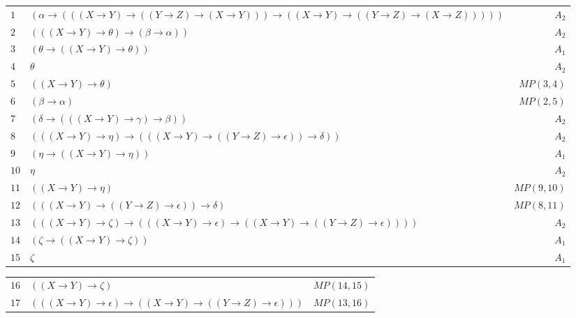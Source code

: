 \begin{ans}
{    \begin{tabular*}{\textwidth}{l l r}
      $1$ & $( \alpha  \rightarrow (((X \rightarrow Y) \rightarrow ((Y \rightarrow Z) \rightarrow (X \rightarrow Y))) \rightarrow ((X \rightarrow Y) \rightarrow ((Y \rightarrow Z) \rightarrow (X \rightarrow Z)))))$ & $A_2$ \\
      $2$ & $(((X \rightarrow Y) \rightarrow  \theta ) \rightarrow ( \beta  \rightarrow  \alpha ))$ & $A_2$ \\
      $3$ & $( \theta  \rightarrow ((X \rightarrow Y) \rightarrow  \theta ))$ & $A_1$ \\
      $4$ & $ \theta $ & $A_2$ \\
      $5$ & $((X \rightarrow Y) \rightarrow  \theta )$ & $MP(3,4)$ \\
      $6$ & $( \beta  \rightarrow  \alpha )$ & $MP(2,5)$ \\
      $7$ & $( \delta  \rightarrow (((X \rightarrow Y) \rightarrow  \gamma ) \rightarrow  \beta ))$ & $A_2$ \\
      $8$ & $(((X \rightarrow Y) \rightarrow  \eta ) \rightarrow (((X \rightarrow Y) \rightarrow ((Y \rightarrow Z) \rightarrow  \epsilon )) \rightarrow  \delta ))$ & $A_2$ \\
      $9$ & $( \eta  \rightarrow ((X \rightarrow Y) \rightarrow  \eta ))$ & $A_1$ \\
      $10$ & $ \eta $ & $A_2$ \\
      $11$ & $((X \rightarrow Y) \rightarrow  \eta )$ & $MP(9,10)$ \\
      $12$ & $(((X \rightarrow Y) \rightarrow ((Y \rightarrow Z) \rightarrow  \epsilon )) \rightarrow  \delta )$ & $MP(8,11)$ \\
      $13$ & $(((X \rightarrow Y) \rightarrow  \zeta ) \rightarrow (((X \rightarrow Y) \rightarrow  \epsilon ) \rightarrow ((X \rightarrow Y) \rightarrow ((Y \rightarrow Z) \rightarrow  \epsilon ))))$ & $A_2$ \\
      $14$ & $( \zeta  \rightarrow ((X \rightarrow Y) \rightarrow  \zeta ))$ & $A_1$ \\
      $15$ & $ \zeta $ & $A_1$
    \end{tabular*}
    \begin{tabular*}{\textwidth}{l l r}
      $16$ & $((X \rightarrow Y) \rightarrow  \zeta )$ & $MP(14,15)$ \\
      $17$ & $(((X \rightarrow Y) \rightarrow  \epsilon ) \rightarrow ((X \rightarrow Y) \rightarrow ((Y \rightarrow Z) \rightarrow  \epsilon )))$ & $MP(13,16)$ \\

\end{tabular*}}
\end{ans}
